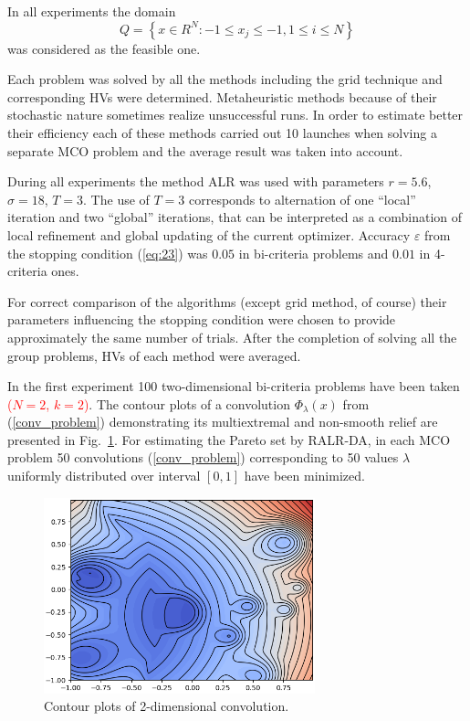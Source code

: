 \documentclass[runningheads]{llncs}
\begin{document}
In all experiments the domain
\[
Q = \left\{x \in R^N : -1 \leq x_j \leq -1, 1 \leq i \leq N \right\}
\]
was considered as the feasible one. 

Each problem was solved by all the methods including the grid technique and corresponding HVs were determined.  Metaheuristic methods because of their stochastic nature sometimes realize unsuccessful runs. In order to estimate better their efficiency each of these methods carried out 10 launches when solving a separate MCO problem and the average result was taken into account.

During all experiments the method ALR was used with parameters $r=5.6$, $\sigma = 18$, $T=3$. 
The use of $T=3$ corresponds to alternation of one ``local'' iteration and two ``global'' iterations, that can be interpreted as a combination of local refinement and global updating of the current optimizer.
Accuracy $\varepsilon$ from the stopping condition (\ref{eq:23}) was $0.05$ in bi-criteria problems and $0.01$ in 4-criteria ones.

For correct comparison of the algorithms (except grid method, of course) their parameters influencing the stopping condition were chosen to provide approximately the same number of trials. After the completion of solving all the group problems, HVs of each method were averaged.

In the first experiment 100 two-dimensional bi-criteria problems have been taken \textcolor{red}{($N=2$, $k=2$)}. The contour plots of a convolution $\Phi_\lambda(x)$ from (\ref{conv_problem})  demonstrating its multiextremal and non-smooth relief are presented in Fig.~\ref{fig1}. For estimating the Pareto set by RALR-DA, in each MCO problem 50 convolutions (\ref{conv_problem}) corresponding to 50 values $\lambda$ uniformly distributed over interval $[0,1]$ have been minimized.

\begin{figure}
\centering
\includegraphics[width=0.7\textwidth]{fig1.png} 
\caption{Contour plots of 2-dimensional convolution.}\label{fig1} 
\end{figure}
\end{document}
